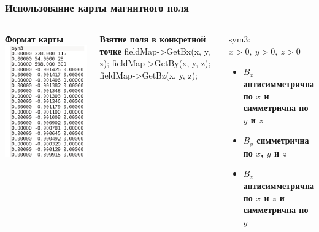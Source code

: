 \documentclass[svgnames] {beamer}
\begin{document}
\begin{frame}
  \frametitle{Использование карты магнитного поля}
  \begin{columns}[c]
    \begin{block}{\centering \bf Формат карты}
      \centering \includegraphics[width=1.0\linewidth]{magFieldMap_format.png}
    \end{block}
    \begin{block}{\centering \bf Взятие поля в конкретной точке}
      \centering fieldMap->GetBx(x, y, z);
      \centering fieldMap->GetBy(x, y, z);
      \centering fieldMap->GetBz(x, y, z);
    \end{block}
    \begin{block}{sym3:}
      \centering $x > 0, ~ y > 0, ~ z > 0$ \\
      \begin{itemize}
      \item { \bf $B_{x}$ антисимметрична по $x$ и симметрична по $y$ и $z$} \\
      \item { \bf $B_{y}$ симметрична по $x$, $y$ и $z$} \\
      \item { \bf $ B_{z}$ антисимметрична по $x$ и $z$ и симметрична по $y$}
      \end{itemize}
    \end{block}
  \end{columns}
\end{frame}
\end{document}
